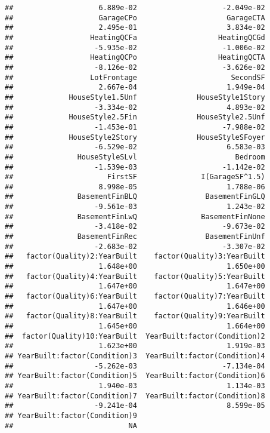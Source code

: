 \documentclass[
]{article}
\begin{document}
\begin{verbatim}
##                    6.889e-02                    -2.049e-02  
##                    GarageCPo                     GarageCTA  
##                    2.495e-01                     3.834e-02  
##                  HeatingQCFa                   HeatingQCGd  
##                   -5.935e-02                    -1.006e-02  
##                  HeatingQCPo                   HeatingQCTA  
##                   -8.126e-02                    -3.626e-02  
##                  LotFrontage                      SecondSF  
##                    2.667e-04                     1.949e-04  
##             HouseStyle1.5Unf              HouseStyle1Story  
##                   -3.334e-02                     4.893e-02  
##             HouseStyle2.5Fin              HouseStyle2.5Unf  
##                   -1.453e-01                    -7.988e-02  
##             HouseStyle2Story              HouseStyleSFoyer  
##                   -6.529e-02                     6.583e-03  
##               HouseStyleSLvl                       Bedroom  
##                   -1.539e-03                    -1.142e-02  
##                      FirstSF               I(GarageSF^1.5)  
##                    8.998e-05                     1.788e-06  
##               BasementFinBLQ                BasementFinGLQ  
##                   -9.561e-03                     1.243e-02  
##               BasementFinLwQ               BasementFinNone  
##                   -3.418e-02                    -9.673e-02  
##               BasementFinRec                BasementFinUnf  
##                   -2.683e-02                    -3.307e-02  
##   factor(Quality)2:YearBuilt    factor(Quality)3:YearBuilt  
##                    1.648e+00                     1.650e+00  
##   factor(Quality)4:YearBuilt    factor(Quality)5:YearBuilt  
##                    1.647e+00                     1.647e+00  
##   factor(Quality)6:YearBuilt    factor(Quality)7:YearBuilt  
##                    1.647e+00                     1.646e+00  
##   factor(Quality)8:YearBuilt    factor(Quality)9:YearBuilt  
##                    1.645e+00                     1.664e+00  
##  factor(Quality)10:YearBuilt  YearBuilt:factor(Condition)2  
##                    1.623e+00                     1.919e-03  
## YearBuilt:factor(Condition)3  YearBuilt:factor(Condition)4  
##                   -5.262e-03                    -7.134e-04  
## YearBuilt:factor(Condition)5  YearBuilt:factor(Condition)6  
##                    1.940e-03                     1.134e-03  
## YearBuilt:factor(Condition)7  YearBuilt:factor(Condition)8  
##                   -9.241e-04                     8.599e-05  
## YearBuilt:factor(Condition)9  
##                           NA
\end{verbatim}
\end{document}
